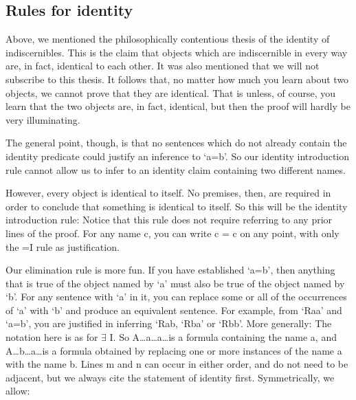 \subsection{Rules for identity}

Above, we mentioned the philosophically contentious thesis of the identity of indiscernibles. This is the claim that objects which are indiscernible in every way are, in fact, identical to each other. It was also mentioned that we will not subscribe to this thesis. It follows that, no matter how much you learn about two objects, we cannot prove that they are identical. That is unless, of course, you learn that the two objects are, in fact, identical, but then the proof will hardly be very illuminating.

The general point, though, is that no sentences which do not already contain the identity predicate could justify an inference to ‘a=b’. So our identity introduction rule cannot allow us to infer to an identity claim containing two different names.

However, every object is identical to itself. No premises, then, are required in order to conclude that something is identical to itself. So this will be the identity introduction rule:
Notice that this rule does not require referring to any prior lines of the proof. For any name c, you can write c = c on any point, with only the =I rule as justification.

Our elimination rule is more fun. If you have established ‘a=b’, then anything that is true of the object named by ‘a’ must also be true of the object named by ‘b’. For any sentence with ‘a’ in it, you can replace some or all of the occurrences of ‘a’ with ‘b’ and produce an equivalent sentence. For example, from ‘Raa’ and ‘a=b’, you are justified in inferring ‘Rab, ‘Rba’ or ‘Rbb’. More generally:
The notation here is as for $\exists$ I. So A\ldots a\ldots a\ldots  is a formula containing the name a, and A\ldots b\ldots a\ldots  is a formula obtained by replacing one or more instances of the name a with the name b. Lines m and n can occur in either order, and do not need to be adjacent, but we always cite the statement of identity first. Symmetrically, we allow:
\begin{fitchproof}
\end{fitchproof}

